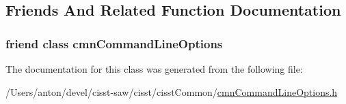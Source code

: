 \subsection{Friends And Related Function Documentation}
\hypertarget{classcmn_command_line_options_1_1_option_one_value_base_a18923f23ed3914806f1edf878a64b422}{}
\subsubsection[{cmn\+Command\+Line\+Options}]{\setlength{\rightskip}{0pt plus 5cm}friend class {\bf cmn\+Command\+Line\+Options}\hspace{0.3cm}{\ttfamily [friend]}}\label{classcmn_command_line_options_1_1_option_one_value_base_a18923f23ed3914806f1edf878a64b422}


The documentation for this class was generated from the following file\+:\begin{DoxyCompactItemize}
\item 
/\+Users/anton/devel/cisst-\/saw/cisst/cisst\+Common/\hyperlink{cmn_command_line_options_8h}{cmn\+Command\+Line\+Options.\+h}\end{DoxyCompactItemize}
